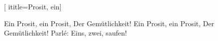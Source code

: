  [
ititle={Prosit, ein}]

\beginverse
Ein Prosit, ein Prosit,
Der Gemütlichkeit!
Ein Prosit, ein Prosit,
Der Gemütlichkeit!
Parlé: Eins, zwei, saufen!
\endverse
\endsong